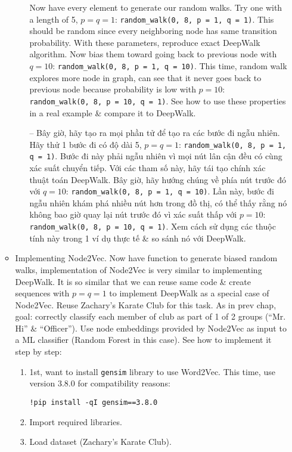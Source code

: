\documentclass{article}
\begin{document}
\begin{itemize}
\begin{itemize}
\begin{itemize}
            Now have every element to generate our random walks. Try one with a length of 5, $p = q = 1$: \verb|random_walk(0, 8, p = 1, q = 1)|. This should be random since every neighboring node has same transition probability. With these parameters, reproduce exact DeepWalk algorithm. Now bias them toward going back to previous node with $q = 10$: \verb|random_walk(0, 8, p = 1, q = 10)|. This time, random walk explores more node in graph, can see that it never goes back to previous node because probability is low with $p = 10$: \verb|random_walk(0, 8, p = 10, q = 1)|. See how to use these properties in a real example \& compare it to DeepWalk.

            -- Bây giờ, hãy tạo ra mọi phần tử để tạo ra các bước đi ngẫu nhiên. Hãy thử 1 bước đi có độ dài 5, $p = q = 1$: \verb|random_walk(0, 8, p = 1, q = 1)|. Bước đi này phải ngẫu nhiên vì mọi nút lân cận đều có cùng xác suất chuyển tiếp. Với các tham số này, hãy tái tạo chính xác thuật toán DeepWalk. Bây giờ, hãy hướng chúng về phía nút trước đó với $q = 10$: \verb|random_walk(0, 8, p = 1, q = 10)|. Lần này, bước đi ngẫu nhiên khám phá nhiều nút hơn trong đồ thị, có thể thấy rằng nó không bao giờ quay lại nút trước đó vì xác suất thấp với $p = 10$: \verb|random_walk(0, 8, p = 10, q = 1)|. Xem cách sử dụng các thuộc tính này trong 1 ví dụ thực tế \& so sánh nó với DeepWalk.
        \end{itemize}
        \item {\sf Implementing Node2Vec.} Now have function to generate biased random walks, implementation of Node2Vec is very similar to implementing DeepWalk. It is so similar that we can reuse same code \& create sequences with $p = q = 1$ to implement DeepWalk as a special case of Node2Vec. Reuse Zachary's Karate Club for this task. As in prev chap, goal: correctly classify each member of club as part of 1 of 2 groups (``Mr. Hi'' \& ``Officer''). Use node embeddings provided by Node2Vec as input to a ML classifier (Random Forest in this case). See how to implement it step by step:
        \begin{enumerate}
            \item 1st, want to install {\tt gensim} library to use Word2Vec. This time, use version 3.8.0 for compatibility reasons:
            \begin{verbatim}
!pip install -qI gensim==3.8.0
            \end{verbatim}
            \item Import required libraries.
            \item Load dataset (Zachary's Karate Club).

\end{enumerate}
\end{itemize}
\end{itemize}
\end{document}
